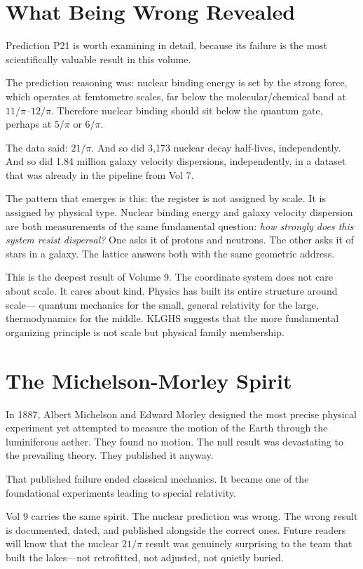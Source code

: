 \documentclass[11pt, letterpaper, openany]{book}
\begin{document}
\section{What Being Wrong Revealed}

Prediction P21 is worth examining in detail, because its failure is the most
scientifically valuable result in this volume.

The prediction reasoning was: nuclear binding energy is set by the strong force,
which operates at femtometre scales, far below the molecular/chemical band at
$11/\pi$--$12/\pi$. Therefore nuclear binding should sit below the quantum gate,
perhaps at $5/\pi$ or $6/\pi$.

The data said: $21/\pi$. And so did 3,173 nuclear decay half-lives, independently.
And so did 1.84 million galaxy velocity dispersions, independently, in a dataset
that was already in the pipeline from Vol 7.

The pattern that emerges is this: the register is not assigned by scale. It is
assigned by physical type. Nuclear binding energy and galaxy velocity dispersion
are both measurements of the same fundamental question: \emph{how strongly does
this system resist dispersal?} One asks it of protons and neutrons. The other
asks it of stars in a galaxy. The lattice answers both with the same geometric
address.

This is the deepest result of Volume 9. The coordinate system does not care about
scale. It cares about kind. Physics has built its entire structure around scale---
quantum mechanics for the small, general relativity for the large, thermodynamics
for the middle. KLGHS suggests that the more fundamental organizing principle is
not scale but physical family membership.

\section{The Michelson-Morley Spirit}

In 1887, Albert Michelson and Edward Morley designed the most precise physical
experiment yet attempted to measure the motion of the Earth through the luminiferous
aether. They found no motion. The null result was devastating to the prevailing
theory. They published it anyway.

That published failure ended classical mechanics. It became one of the foundational
experiments leading to special relativity.

Vol 9 carries the same spirit. The nuclear prediction was wrong. The wrong result
is documented, dated, and published alongside the correct ones. Future readers will
know that the nuclear $21/\pi$ result was genuinely surprising to the team that
built the lakes---not retrofitted, not adjusted, not quietly buried.
\end{document}
